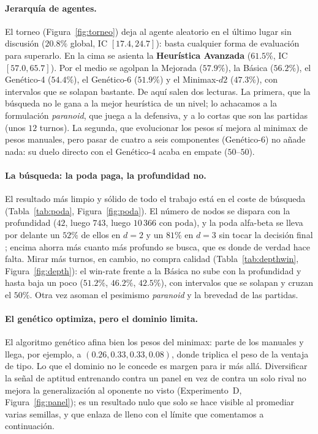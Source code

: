 \documentclass[11pt]{article}
\begin{document}
\paragraph{Jerarquía de agentes.} El torneo (Figura~\ref{fig:torneo}) deja al
agente aleatorio en el último lugar sin discusión ($20.8\%$ global, IC
$[17.4,24.7]$): basta cualquier forma de evaluación para superarlo. En la cima se
asienta la \textbf{Heurística Avanzada} ($61.5\%$, IC $[57.0,65.7]$). Por el medio
se agolpan la Mejorada ($57.9\%$), la Básica ($56.2\%$), el Genético-4 ($54.4\%$),
el Genético-6 ($51.9\%$) y el Minimax-$d2$ ($47.3\%$), con intervalos que se solapan
bastante. De aquí salen dos lecturas. La primera, que la búsqueda no le gana a la
mejor heurística de un nivel; lo achacamos a la formulación \emph{paranoid}, que
juega a la defensiva, y a lo cortas que son las partidas (unos $12$ turnos). La
segunda, que evolucionar los pesos sí mejora al minimax de pesos manuales, pero
pasar de cuatro a seis componentes (Genético-6) no añade nada: su duelo directo con
el Genético-4 acaba en empate ($50$--$50$).

\paragraph{La búsqueda: la poda paga, la profundidad no.} El resultado más limpio y
sólido de todo el trabajo está en el coste de búsqueda (Tabla~\ref{tab:poda},
Figura~\ref{fig:poda}). El número de nodos se dispara con la profundidad ($42$,
luego $743$, luego $10\,366$ con poda), y la poda alfa-beta se lleva por delante un
$52\%$ de ellos en $d{=}2$ y un $81\%$ en $d{=}3$ sin tocar la decisión final
\citep{knuth1975}; encima ahorra más cuanto más profundo se busca, que es donde de
verdad hace falta. Mirar más turnos, en cambio, no compra calidad
(Tabla~\ref{tab:depthwin}, Figura~\ref{fig:depth}): el win-rate frente a la Básica
no sube con la profundidad y hasta baja un poco ($51.2\%$, $46.2\%$, $42.5\%$), con
intervalos que se solapan y cruzan el $50\%$. Otra vez asoman el pesimismo
\emph{paranoid} y la brevedad de las partidas.

\paragraph{El genético optimiza, pero el dominio limita.} El algoritmo genético
afina bien los pesos del minimax: parte de los manuales y llega, por ejemplo, a
$(0.26,0.33,0.33,0.08)$, donde triplica el peso de la ventaja de tipo. Lo que el
dominio no le concede es margen para ir más allá. Diversificar la señal de aptitud
entrenando contra un panel en vez de contra un solo rival no mejora la
generalización al oponente no visto (Experimento~D, Figura~\ref{fig:panel}); es un
resultado nulo que solo se hace visible al promediar varias semillas, y que enlaza
de lleno con el límite que comentamos a continuación.
\end{document}
